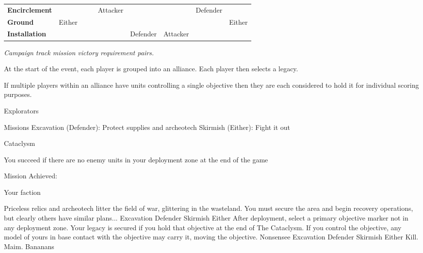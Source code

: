 \documentclass{40k}
\begin{document}
\begin{minipage}[t]{1.0\linewidth}
\begin{tabular}{|l|c|c|c|c|c|c|c|c|}
{\bf Encirclement}  &                   &                &                      & Attacker        &                 &                & Defender        &               \\
{\bf Ground}        & Either            &                &                      &                 &                 &                &                 & Either        \\
{\bf Installation}  &                   &                &                      &                 & Defender        & Attacker       &                 &               \\
\hline
\end{tabular}

\small\it\smallskip
Campaign track mission victory requirement pairs.
\end{minipage}


At the start of the event, each player is grouped into an alliance.
Each player then selects a legacy.

If multiple players within an alliance have units controlling a single
objective then they are each considered to hold it for individual
scoring purposes.


Explorators

Missions
  Excavation (Defender): Protect supplies and archeotech
  Skirmish (Either): Fight it out

Cataclysm
    
  You succeed if there are no enemy units in your deployment zone at the end of the game

Mission Achieved:

  Your faction

\squelchbackground

\begin{landscape}%
\vspace*{-15pt}%
\noindent{}%
{Priceless relics and archeotech litter the field of war, glittering
  in the wasteland.  You must secure the area and begin recovery
  operations, but clearly others have similar plans...}%
{Excavation}%
{Defender}%
{Skirmish}%
{Either}%
{After deployment, select a primary objective marker not in any deployment zone.  Your legacy is secured if you hold that objective at the end of The Cataclysm.}
{If you control the objective, any model of yours in base contact with the objective may carry it, moving the objective.}
\hfill%
%
{Nonsensee}%
{Excavation}%
{Defender}%
{Skirmish}%
{Either}%
{Kill.  Maim.}
{Bananans}%
\end{landscape}
\end{document}
